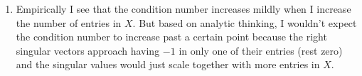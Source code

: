 \documentclass[11pt]{article}
\begin{document}
\begin{solution}
\begin{enumerate}
\item Empirically I see that the condition number increases mildly when I increase the number of entries in $X$. But based on analytic thinking, I wouldn't expect the condition number to increase past a certain point because the right singular vectors approach having $-1$ in only one of their entries (rest zero) and the singular values would just scale together with more entries in $X$.

\end{enumerate}
\end{solution}
\end{document}
